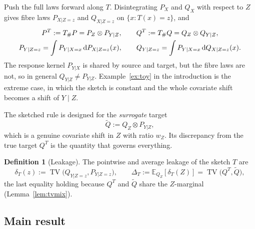 \documentclass[11pt,a4paper]{article}
\newcommand{\PX}{P_X}
\newcommand{\QX}{Q_X}
\newcommand{\E}{\mathbb{E}}
\newcommand{\TV}{\operatorname{TV}}
\newcommand{\Qt}{\widetilde Q}
\theoremstyle{plain}
\theoremstyle{definition}
\newtheorem{definition}[theorem]{Definition}
\theoremstyle{remark}
\begin{document}
Push the full laws forward along $T$. Disintegrating $\PX$ and $\QX$ with respect to $Z$ gives fibre laws $P_{X|Z=z}$ and $Q_{X|Z=z}$ on $\{x:T(x)=z\}$, and
\begin{gather}
P^T:=T_\#P=P_Z\otimes P_{Y|Z},\qquad Q^T:=T_\#Q=Q_Z\otimes Q_{Y|Z},\notag\\
P_{Y|Z=z}=\int P_{Y|X=x}\,\mathrm dP_{X|Z=z}(x),\qquad
Q_{Y|Z=z}=\int P_{Y|X=x}\,\mathrm dQ_{X|Z=z}(x).\label{eq:fibre}
\end{gather}
The response kernel $P_{Y|X}$ is shared by source and target, but the fibre laws are not, so in general $Q_{Y|Z}\ne P_{Y|Z}$.
Example~\ref{ex:toy} in the introduction is the extreme case, in which the sketch is constant and the whole covariate shift becomes a shift of $Y\mid Z$.

The sketched rule is designed for the \emph{surrogate} target
\[
\Qt:=Q_Z\otimes P_{Y|Z},
\]
which is a genuine covariate shift in $Z$ with ratio $w_Z$. Its discrepancy from the true target $Q^T$ is the quantity that governs everything.

\begin{definition}[Leakage]
The pointwise and average leakage of the sketch $T$ are
\[
\delta_T(z):=\TV\bigl(Q_{Y|Z=z},P_{Y|Z=z}\bigr),\qquad
\Delta_T:=\E_{Q_Z}[\delta_T(Z)]=\TV\bigl(Q^T,\Qt\bigr),
\]
the last equality holding because $Q^T$ and $\Qt$ share the $Z$-marginal (Lemma~\ref{lem:tvmix}).
\end{definition}
\subsection{Main result}
\end{document}
